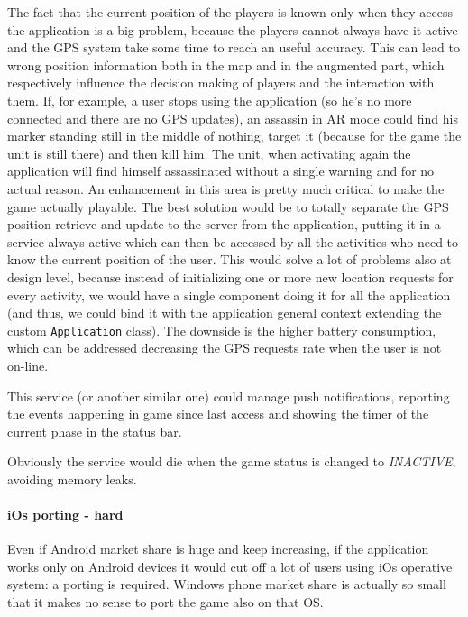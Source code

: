 		The fact that the current position of the players is known only when they access the application is a big problem, because the players cannot always have it active and the GPS system take some time to reach an useful accuracy. This can lead to wrong position information both in the map and in the augmented part, which respectively influence the decision making of players and the interaction with them. If, for example, a user stops using the application (so he's no more connected and there are no GPS updates), an assassin in AR mode could find his marker standing still in the middle of nothing, target it (because for the game the unit is still there) and then kill him. The unit, when activating again the application will find himself assassinated without a single warning and for no actual reason. An enhancement in this area is pretty much critical to make the game actually playable. The best solution would be to totally separate the GPS position retrieve and update to the server from the application, putting it in a service always active which can then be accessed by all the activities who need to know the current position of the user.
		This would solve a lot of problems also at design level, because instead of initializing one or more new location requests for every activity, we would have a single component doing it for all the application (and thus, we could bind it with the application general context extending the custom \lstinline|Application| class).
		The downside is the higher battery consumption, which can be addressed decreasing the GPS requests rate when the user is not on-line.
		
		This service (or another similar one) could manage push notifications, reporting the events happening in game since last access and showing the timer of the current phase in the status bar.
		
		Obviously the service would die when the game status is changed to \emph{INACTIVE}, avoiding memory leaks.
	
	\paragraph{iOs porting - hard}
	
		Even if Android market share is huge and keep increasing, if the application works only on Android devices it would cut off a lot of users using iOs operative system: a porting is required. Windows phone market share is actually so small that it makes no sense to port the game also on that OS.
	
